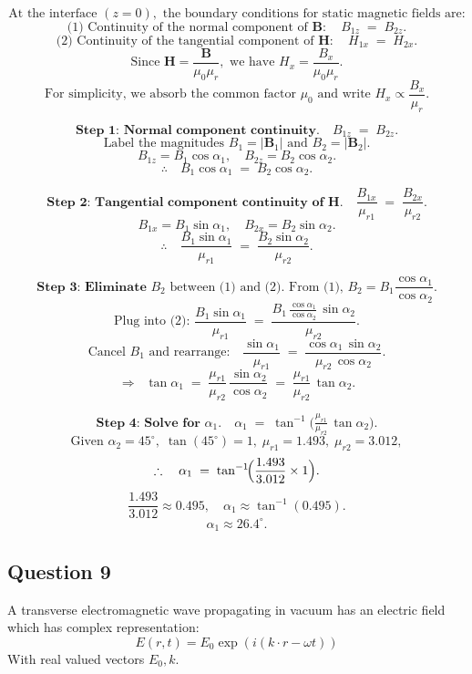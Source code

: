 \documentclass{article}
\begin{document}
\[
\text{At the interface } (z=0), \text{ the boundary conditions for static magnetic fields are:}
\]
\[
\text{(1) Continuity of the normal component of } \mathbf{B}:
\quad B_{1z} \;=\; B_{2z}.
\]
\[
\text{(2) Continuity of the tangential component of } \mathbf{H}:
\quad H_{1x} \;=\; H_{2x}.
\]
\[
\text{Since } \mathbf{H} = \frac{\mathbf{B}}{\mu_0 \mu_r}, \text{ we have }
H_x = \frac{B_x}{\mu_0 \mu_r}.
\]
\[
\text{For simplicity, we absorb the common factor } \mu_0 \text{ and write } 
H_x \propto \frac{B_x}{\mu_r}.
\]

\[
\textbf{Step 1: Normal component continuity.} \quad
B_{1z} \;=\; B_{2z}.
\]
\[
\text{Label the magnitudes } B_1 = |\mathbf{B}_1| \text{ and } B_2 = |\mathbf{B}_2|.
\]
\[
B_{1z} = B_1 \cos \alpha_1, 
\quad
B_{2z} = B_2 \cos \alpha_2.
\]
\[
\therefore \quad B_1 \cos \alpha_1 \;=\; B_2 \cos \alpha_2.
\tag{1}
\]

\[
\textbf{Step 2: Tangential component continuity of } \mathbf{H}. 
\quad
\frac{B_{1x}}{\mu_{r1}} \;=\; \frac{B_{2x}}{\mu_{r2}}.
\]
\[
B_{1x} = B_1 \sin \alpha_1,
\quad
B_{2x} = B_2 \sin \alpha_2.
\]
\[
\therefore \quad \frac{B_1 \sin \alpha_1}{\mu_{r1}} 
\;=\; \frac{B_2 \sin \alpha_2}{\mu_{r2}}.
\tag{2}
\]

\[
\textbf{Step 3: Eliminate } B_2 \text{ between (1) and (2). From (1), }
B_2 = B_1 \frac{\cos \alpha_1}{\cos \alpha_2}.
\]
\[
\text{Plug into (2): }
\frac{B_1 \sin \alpha_1}{\mu_{r1}}
\;=\;
\frac{B_1 \,\frac{\cos \alpha_1}{\cos \alpha_2}\,\sin \alpha_2}{\mu_{r2}}.
\]
\[
\text{Cancel } B_1 \text{ and rearrange:}
\quad
\frac{\sin \alpha_1}{\mu_{r1}}
\;=\;
\frac{\cos \alpha_1 \,\sin \alpha_2}{\mu_{r2}\,\cos \alpha_2}.
\]
\[
\Rightarrow \;\;
\tan \alpha_1
\;=\;
\frac{\mu_{r1}}{\mu_{r2}}\,
\frac{\sin \alpha_2}{\cos \alpha_2}
\;=\;
\frac{\mu_{r1}}{\mu_{r2}}\,
\tan \alpha_2.
\]

\[
\textbf{Step 4: Solve for } \alpha_1. 
\quad
\alpha_1
\;=\;
\tan^{-1}\!\bigl(\tfrac{\mu_{r1}}{\mu_{r2}}\,
\tan \alpha_2 \bigr).
\]
\[
\text{Given } \alpha_2 = 45^\circ,\;
\tan(45^\circ) = 1,\;
\mu_{r1} = 1.493,\;
\mu_{r2} = 3.012,
\]
\[
\therefore \quad
\alpha_1
\;=\;
\tan^{-1}\!\Bigl(\frac{1.493}{3.012}\times 1\Bigr).
\]
\[
\frac{1.493}{3.012} \approx 0.495,
\quad
\alpha_1 \approx \tan^{-1}(0.495).
\]
\[
\boxed{
\alpha_1 \approx 26.4^\circ.
}
\]


\subsection{Question 9}
A transverse electromagnetic wave propagating in vacuum has an electric field which has complex representation:
\[
E(r, t) = E_0 \exp(i (k \cdot r - \omega t))
\]
With real valued vectors \(E_0, k\).
\end{document}
